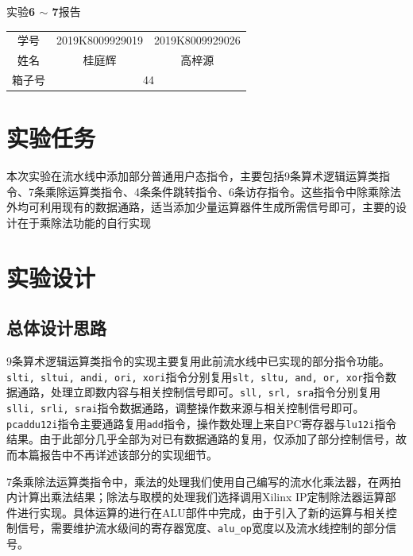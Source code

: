 \documentclass[UTF-8,twoside,c5size]{ctexart}
\begin{document}
	\begin{center}
		\heiti{}
		实验\textbf{6 $ \bm\sim $ 7}报告
	\end{center}

	\begin{table}[!h]
		\raggedleft
		\begin{tabular}{ccc}
			{\heiti 学号} & {2019K8009929019} & {2019K8009929026} \\
			{\heiti 姓名} & 桂庭辉 & 高梓源 \\
			{\heiti 箱子号} & \multicolumn{2}{c}{44}
		\end{tabular}
	\end{table}
	
	\section{实验任务}
	
	本次实验在流水线中添加部分普通用户态指令，主要包括9条算术逻辑运算类指令、7条乘除运算类指令、4条条件跳转指令、6条访存指令。这些指令中除乘除法外均可利用现有的数据通路，适当添加少量运算器件生成所需信号即可，主要的设计在于乘除法功能的自行实现
	
	\section{实验设计}	
	
	\subsection{总体设计思路}
	
	9条算术逻辑运算类指令的实现主要复用此前流水线中已实现的部分指令功能。\texttt{slti, sltui, andi, ori, xori}指令分别复用\texttt{slt, sltu, and, or, xor}指令数据通路，处理立即数内容与相关控制信号即可。\texttt{sll, srl, sra}指令分别复用\texttt{slli, srli, srai}指令数据通路，调整操作数来源与相关控制信号即可。\texttt{pcaddu12i}指令主要通路复用\texttt{add}指令，操作数处理上来自PC寄存器与\texttt{lu12i}指令结果。由于此部分几乎全部为对已有数据通路的复用，仅添加了部分控制信号，故而本篇报告中不再详述该部分的实现细节。
	
	7条乘除法运算类指令中，乘法的处理我们使用自己编写的流水化乘法器，在两拍内计算出乘法结果；除法与取模的处理我们选择调用Xilinx IP定制除法器运算部件进行实现。具体运算的进行在ALU部件中完成，由于引入了新的运算与相关控制信号，需要维护流水级间的寄存器宽度、\texttt{alu\_op}宽度以及流水线控制的部分信号。
	
\end{document}
